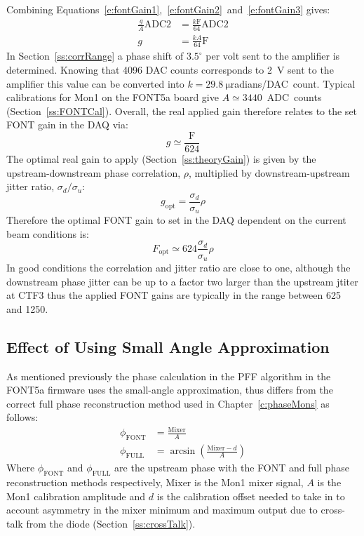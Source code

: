 Combining Equations~\ref{e:fontGain1},~\ref{e:fontGain2}~and~\ref{e:fontGain3} gives:
\begin{align}
\frac{g}{A}\mathrm{ADC2} &= \frac{k\mathrm{F}}{64}\mathrm{ADC2} \nonumber \\
g &= \frac{kA}{64}\mathrm{F} \label{e:fontGain4}
\end{align}
In Section~\ref{ss:corrRange} a phase shift of \(3.5^\circ\) per volt sent to the amplifier is determined. Knowing that 4096 DAC counts corresponds to 2~V sent to the amplifier this value can be converted into \(k = 29.8~\mathrm{\mu}\)radians/DAC~count. Typical calibrations for Mon1 on the FONT5a board give \(A \simeq 3440\)~ADC~counts (Section~\ref{ss:FONTCal}). Overall, the real applied gain therefore relates to the set FONT gain in the DAQ via:
\begin{equation}
g \simeq \frac{\mathrm{F}}{624}
\end{equation}
The optimal real gain to apply (Section~\ref{ss:theoryGain}) is given by the upstream-downstream phase correlation, \(\rho\), multiplied by downstream-upstream jitter ratio, \(\sigma_{d}/\sigma_{u}\):
\begin{equation}
g_{\mathrm{opt}} = \frac{\sigma_{d}}{\sigma_{u}} \rho  
\end{equation}
Therefore the optimal FONT gain to set in the DAQ dependent on the current beam conditions is:
\begin{equation}
F_{\mathrm{opt}} \simeq 624 \frac{\sigma_{d}}{\sigma_{u}} \rho
\end{equation}
In good conditions the correlation and jitter ratio are close to one, although the downstream phase jitter can be up to a factor two larger than the upstream jtiter at CTF3 thus the applied FONT gains are typically in the range between 625 and 1250.

\subsection{Effect of Using Small Angle Approximation}
\label{ss:fontSmallAng}

As mentioned previously the phase calculation in the PFF algorithm in the FONT5a firmware uses the small-angle approximation, thus differs from the correct full phase reconstruction method used in Chapter~\ref{c:phaseMons} as follows:
\begin{align}
\phi_{\mathrm{FONT}} &= \frac{\mathrm{Mixer}}{A} \\
\phi_{\mathrm{FULL}} &= \arcsin\left(\frac{\mathrm{Mixer}-d}{A}\right)
\end{align}
Where \(\phi_{\mathrm{FONT}}\) and \(\phi_{\mathrm{FULL}}\) are the upstream phase with the FONT and full phase reconstruction methods respectively, \(\mathrm{Mixer}\) is the Mon1 mixer signal, \(A\) is the Mon1 calibration amplitude and \(d\) is the calibration offset needed to take in to account asymmetry in the mixer minimum and maximum output due to cross-talk from the diode (Section~\ref{ss:crossTalk}).

